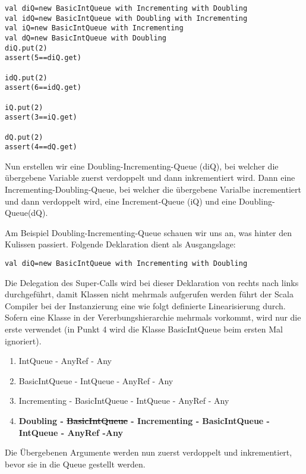 \begin{lstlisting}[caption=Traits: Verschiedene Instanzen vom Typ IntQueue und die entsprechenden Auswirkungen]
val diQ=new BasicIntQueue with Incrementing with Doubling
val idQ=new BasicIntQueue with Doubling with Incrementing
val iQ=new BasicIntQueue with Incrementing
val dQ=new BasicIntQueue with Doubling
diQ.put(2)
assert(5==diQ.get)

idQ.put(2)
assert(6==idQ.get)

iQ.put(2)
assert(3==iQ.get)

dQ.put(2)
assert(4==dQ.get)
\end{lstlisting}
Nun erstellen wir eine Doubling-Incrementing-Queue (diQ), bei welcher die \"ubergebene Variable zuerst verdoppelt und dann inkrementiert wird. Dann eine Incrementing-Doubling-Queue, bei welcher die \"ubergebene Varialbe incrementiert und dann verdoppelt wird, eine Increment-Queue (iQ) und eine Doubling-Queue(dQ).

Am Beispiel Doubling-Incrementing-Queue schauen wir uns an, was hinter den Kulissen passiert. Folgende Deklaration dient als Ausgangslage: 
\begin{lstlisting}[caption=Traits: Deklaration Doubling-Incrementing-Queue]
val diQ=new BasicIntQueue with Incrementing with Doubling
\end{lstlisting}

Die Delegation des Super-Calls wird bei dieser Deklaration von rechts nach links durchgef\"uhrt, damit Klassen nicht mehrmals aufgerufen werden f\"uhrt der Scala Compiler bei der Instanzierung eine wie folgt definierte Linearisierung durch. Sofern eine Klasse in der Vererbungshierarchie mehrmals vorkommt, wird nur die erste verwendet (in Punkt 4 wird die Klasse BasicIntQueue beim ersten Mal ignoriert). 
\begin{enumerate}
	\item IntQueue - AnyRef - Any
	\item BasicIntQueue - IntQueue - AnyRef - Any
	\item Incrementing - BasicIntQueue - IntQueue - AnyRef - Any
	\item \bf{Doubling - \sout{BasicIntQueue} - Incrementing - BasicIntQueue - IntQueue - AnyRef -Any}
\end{enumerate}
Die \"Ubergebenen Argumente werden nun zuerst verdoppelt und inkrementiert, bevor sie in die Queue gestellt werden.


